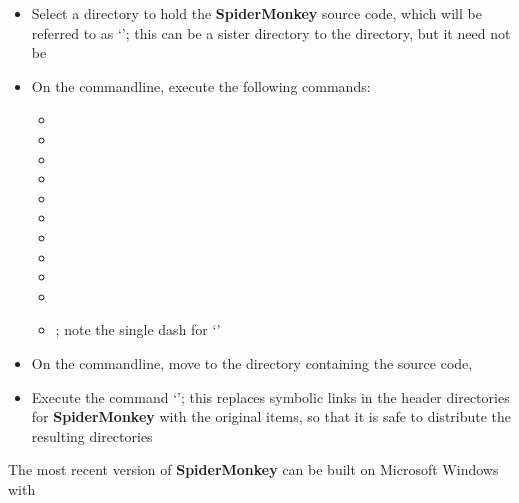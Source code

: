 \begin{itemize}
\item Select a directory to hold the \textbf{SpiderMonkey} source code, which will be
referred to as `'; this can be a sister directory to the
 directory, but it need not be
\item\exSp{}On the command\longDash{}line, execute the following commands:
\begin{itemize}
\item{}
\item\exSp{}
\item\exSp{}
\item\exSp{}
\item\exSp{}
\item\exSp{}
\item\exSp{}
\item\exSp{}
\item\exSp{}
\item\exSp{}
\item\exSp{}; note
the single dash for `'
\end{itemize}
\item\exSp{}On the command\longDash{}line, move to the directory containing the \mplusm{}
source code, 
\item\exSp{}Execute the command `'; this replaces symbolic links in the
header directories for \textbf{SpiderMonkey} with the original items, so that it is safe
to distribute the resulting directories
\end{itemize}
\tertiaryEnd
{}
The most recent version of \textbf{SpiderMonkey} can be built on Microsoft Windows with
